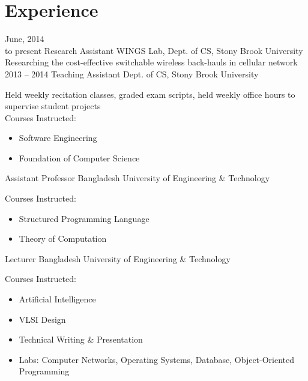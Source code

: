 \documentclass[]{friggeri-cv} %
\begin{document}
\section{Experience}
\begin{entrylist}  
\entry
{June, 2014 \\to present}   
{Research Assistant}
{WINGS Lab, Dept. of CS, Stony Brook University}
{Researching the cost-effective switchable wireless back-hauls in cellular network}
\entry
{2013 -- 2014}
{Teaching Assistant}
{Dept. of CS, Stony Brook University}
{
  Held weekly recitation classes, graded exam scripts, held weekly office hours
  to supervise student projects\\ 
  Courses Instructed:
  	\begin{itemize}
  	  \item Software Engineering
  	  \item Foundation of Computer Science
  	 \end{itemize} 
}
{Assistant Professor}
{Bangladesh University of Engineering \& Technology}
{Courses Instructed:
	\begin{itemize}
	  \item Structured Programming Language
	  \item Theory of Computation
	\end{itemize}
}
{Lecturer}
{Bangladesh University of Engineering \& Technology}
{Courses Instructed:
	\begin{itemize}
	  \item Artificial Intelligence
	  \item VLSI Design
	  \item Technical Writing \& Presentation
	  \item Labs: Computer Networks, Operating Systems, Database, Object-Oriented
	  Programming
	\end{itemize}
}
\end{entrylist}
\end{document}
